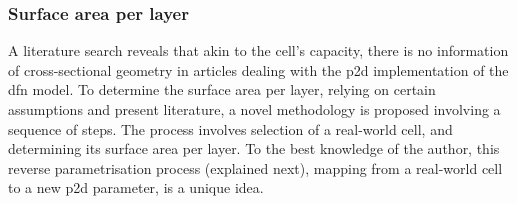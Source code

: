 \subsubsection*{Surface area per layer}\label{sec:surfareaperlayer}

A  literature search  reveals that  akin  to the  cell's capacity,  there is  no
information of cross-sectional  geometry in articles dealing  with the \gls{p2d}
implementation of the \gls{dfn} model. To  determine the surface area per layer,
relying on  certain assumptions and  present literature, a novel  methodology is
proposed involving  a sequence  of steps.  The process  involves selection  of a
real-world  cell, and  determining  its  surface area  per  layer.  To the  best
knowledge of the author, this  reverse parametrisation process (explained next),
mapping from a real-world cell to a new \gls{p2d} parameter, is a unique idea.

